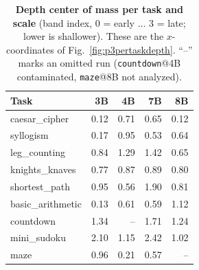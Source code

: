 \documentclass{article}
\begin{document}
\begin{table}[h]
\centering\small
\caption{\textbf{Depth center of mass per task and scale} (band index, 0 = early $\dots$ 3 = late;
lower is shallower). These are the $x$-coordinates of Fig.~\ref{fig:p3pertaskdepth}. ``--'' marks an
omitted run (\texttt{countdown}@4B contaminated, \texttt{maze}@8B not analyzed).}
\label{tab:p3-pertask-depth}
\begin{tabular}{lrrrr}
\toprule
Task & 3B & 4B & 7B & 8B\\
\midrule
caesar\_cipher    & 0.12 & 0.71 & 0.65 & 0.12\\
syllogism         & 0.17 & 0.95 & 0.53 & 0.64\\
leg\_counting     & 0.84 & 1.29 & 1.42 & 0.65\\
knights\_knaves   & 0.77 & 0.87 & 0.89 & 0.80\\
shortest\_path    & 0.95 & 0.56 & 1.90 & 0.81\\
basic\_arithmetic & 0.13 & 0.61 & 0.59 & 1.12\\
countdown         & 1.34 & --   & 1.71 & 1.24\\
mini\_sudoku      & 2.10 & 1.15 & 2.42 & 1.02\\
maze              & 0.96 & 0.21 & 0.57 & --\\
\bottomrule
\end{tabular}
\end{table}
\end{document}
